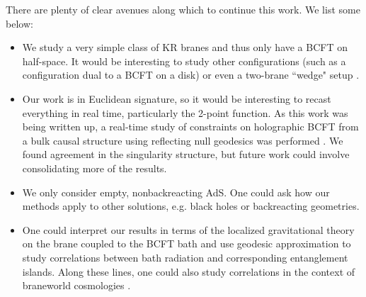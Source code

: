 \documentclass[reprint,amsmath,amssymb,aps,nofootinbib,twocolumn]{revtex4-2}
\begin{document}
There are plenty of clear avenues along which to continue this work. We list some below:
\begin{itemize}
\item We study a very simple class of KR branes and thus only have a BCFT on half-space. It would be interesting to study other configurations (such as a configuration dual to a BCFT on a disk) or even a two-brane ``wedge" setup \cite{Akal:2020wfl,Geng:2020fxl,Geng:2021iyq}.

\item Our work is in Euclidean signature, so it would be interesting to recast everything in real time, particularly the 2-point function. As this work was being written up, a real-time study of constraints on holographic BCFT from a bulk causal structure using reflecting null geodesics was performed \cite{Reeves:2021sab}. We found agreement in the singularity structure, but future work could involve consolidating more of the results.

\item We only consider empty, nonbackreacting AdS. One could ask how our methods apply to other solutions, e.g. black holes or backreacting geometries.

\item One could interpret our results in terms of the localized gravitational theory on the brane coupled to the BCFT bath and use geodesic approximation to study correlations between bath radiation and corresponding entanglement islands. Along these lines, one could also study correlations in the context of braneworld cosmologies \cite{Antonini:2019qkt}.

\end{itemize}


\end{document}
